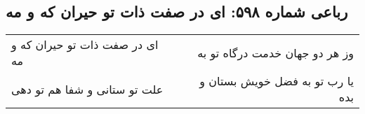 \begin{center}
\section*{رباعی شماره ۵۹۸: ای در صفت ذات تو حیران که و مه}
\label{sec:sh598}
\begin{longtable}{l p{0.5cm} r}
ای در صفت ذات تو حیران که و مه
&&
وز هر دو جهان خدمت درگاه تو به
\\
علت تو ستانی و شفا هم تو دهی
&&
یا رب تو به فضل خویش بستان و بده
\\
\end{longtable}
\end{center}

